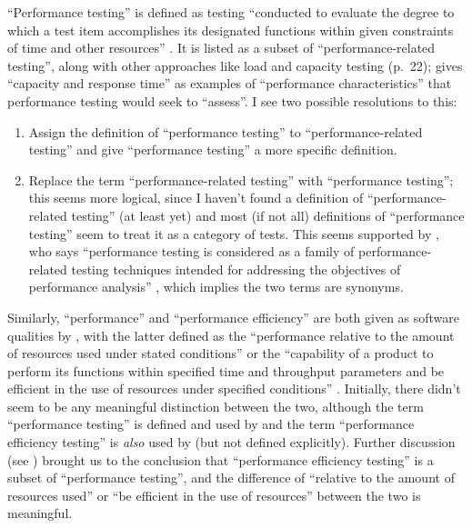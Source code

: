 ``Performance testing'' is defined as testing ``conducted to
evaluate the degree to which a test item accomplishes its
designated functions within given constraints of time and other
resources'' \citep[p.~7]{IEEE2022}. It is listed as a subset of
``performance-related testing'', along with other approaches like
load and capacity testing (p.~22); \citet[p.~5-9]{SWEBOK2024}
gives ``capacity and response time'' as examples of ``performance
characteristics'' that performance testing would seek to ``assess''.
I see two possible resolutions to this:
\begin{enumerate}
      \item Assign the definition of ``performance testing'' to
            ``performance-related testing'' and give ``performance
            testing'' a more specific definition.
      \item Replace the term ``performance-related testing'' with
            ``performance testing''; this seems more logical, since
            I haven't found a definition of ``performance-related
            testing'' (at least yet) and most (if not all)
            definitions of ``performance testing'' seem to treat it
            as a category of tests. This seems supported by
            \citeauthor{Moghadam2019}, who says ``performance testing
            is considered as a family of performance-related testing
            techniques intended for addressing the objectives of performance
            analysis'' \citeyearpar[p.~1187]{Moghadam2019}, which implies the
            two terms are synonyms.
\end{enumerate}

Similarly, ``performance'' and ``performance efficiency'' are
both given as software qualities by \citeauthor{IEEE2017}, with the latter
defined as the ``performance relative to the amount
of resources used under stated conditions'' \citeyearpar[p.~319]{IEEE2017}
or the ``capability of a product to perform its functions within specified
time and throughput parameters and be efficient in the use of resources under
specified conditions'' \citep{ISO_IEC2023a}.
Initially, there didn't seem to be any meaningful distinction
between the two, although the term ``performance testing'' is defined
\citeyearpar[p.~320]{IEEE2017} and used by \citeauthor{IEEE2017} and
the term ``performance efficiency testing'' is \emph{also} used by
\citeauthor{IEEE2017} (but not defined explicitly). Further discussion (see
) brought us to the conclusion that ``performance
efficiency testing'' is a subset of ``performance testing'', and the
difference of ``relative to the amount of resources used'' or ``be efficient in
the use of resources'' between the two is meaningful.

